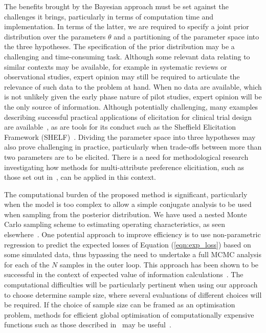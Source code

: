 \documentclass[AMA,STIX1COL]{WileyNJD-v2}
\begin{document}
The benefits brought by the Bayesian approach must be set against the challenges it brings, particularly in terms of computation time and implementation. In terms of the latter, we are required to specify a joint prior distribution over the parameters $\theta$ and a partitioning of the parameter space into the three hypotheses. The specification of the prior distribution may be a challenging and time-consuming task. Although some relevant data relating to similar contexts may be available, for example in systematic reviews or observational studies, expert opinion may still be required to articulate the relevance of such data to the problem at hand. When no data are available, which is not unlikely given the early phase nature of pilot studies, expert opinion will be the only source of information. Although potentially challenging, many examples describing successful practical applications of elicitation for clinical trial design are available~\cite{Walley2015, Crisp2018, Dallow2018}, as are tools for its conduct such as the Sheffield Elicitation Framework (SHELF)~\cite{OHagan2006a}. Dividing the parameter space into three hypotheses may also prove challenging in practice, particularly when trade-offs between more than two parameters are to be elicited. There is a need for methodological research investigating how methods for multi-attribute preference elicitiation, such as those set out in~\cite{Keeney1976}, can be applied in this context. 


The computational burden of the proposed method is significant, particularly when the model is too complex to allow a simple conjugate analysis to be used when sampling from the posterior distribution. We have used a nested Monte Carlo sampling scheme to estimating operating characteristics, as seen elsewhere~\cite{Wang2002, OHagan2005, Sutton2007}. One potential approach to improve efficiency is to use non-parametric regression to predict the expected losses of Equation (\ref{eqn:exp_loss}) based on some simulated data, thus bypassing the need to undertake a full MCMC analysis for each of the $N$ samples in the outer loop. This approach has been shown to be successful in the context of expected value of information calculations~\cite{Strong2014, Strong2015}. The computational difficulties will be particularly pertinent when using our approach to choose determine sample size, where several evaluations of different choices will be required. If the choice of sample size can be framed as an optimisation problem, methods for efficient global optimisation of computationally expensive functions such as those described in~\cite{Jones2001, Roustant2012} may be useful~\cite{Wilson2015}.
\end{document}
